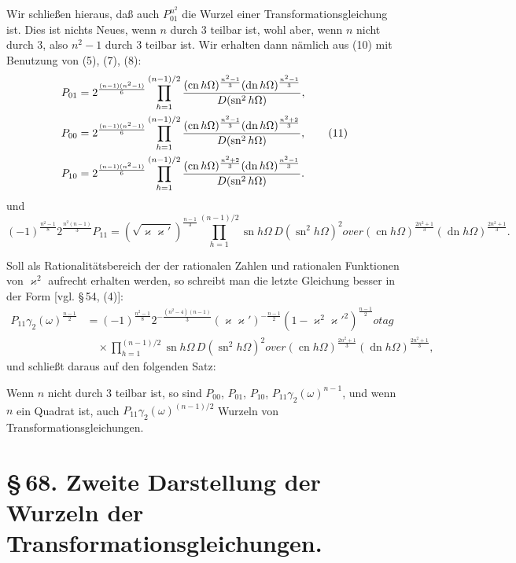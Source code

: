 \documentclass[11pt]{article}
\providecommand{\sn}{\operatorname{sn}}
\providecommand{\cn}{\operatorname{cn}}
\providecommand{\dn}{\operatorname{dn}}
\begin{document}
Wir schließen hieraus, daß auch $P_{01}^{n^2}$ die Wurzel einer Transformationsgleichung
ist. Dies ist nichts Neues, wenn $n$ durch $3$ teilbar ist, wohl aber, wenn $n$ nicht durch
$3$, also $n^2-1$ durch $3$ teilbar ist. Wir erhalten dann nämlich aus (10) mit Benutzung
von (5), (7), (8):
\begin{align}
 P_{01}&=2^{\frac{(n-1)(n^2-1)}{6}}
 \prod_{h=1}^{(n-1)/2}{(\cn h\Omega)^{\frac{n^2-1}{3}}(\dn h\Omega)^{\frac{n^2-1}{3}}
 \over D(\sn^2h\Omega)},\notag\\
 P_{00}&=2^{\frac{(n-1)(n^2-1)}{6}}
 \prod_{h=1}^{(n-1)/2}{(\cn h\Omega)^{\frac{n^2-1}{3}}(\dn h\Omega)^{\frac{n^2+2}{3}}
 \over D(\sn^2h\Omega)},
\tag{11}\\
 P_{10}&=2^{\frac{(n-1)(n^2-1)}{6}}
 \prod_{h=1}^{(n-1)/2}{(\cn h\Omega)^{\frac{n^2+2}{3}}(\dn h\Omega)^{\frac{n^2-1}{3}}
 \over D(\sn^2h\Omega)}.\notag
\end{align}
und
\begin{equation}
 (-1)^{\frac{n^2-1}{8}}2^{\frac{n^2(n-1)}{3}}P_{11}
 =(\sqrt{\varkappa\varkappa'})^{\frac{n-1}{3}}
 \prod_{h=1}^{(n-1)/2}{\sn h\Omega\,D(\sn^2h\Omega)^2
over (\cn h\Omega)^{\frac{2n^2+1}{3}}(\dn h\Omega)^{\frac{2n^2+1}{3}}}.
\tag{12}
\end{equation}

Soll als Rationalitätsbereich der der rationalen Zahlen und rationalen Funktionen von
$\varkappa^2$ aufrecht erhalten werden, so schreibt man die letzte Gleichung besser in der
Form [vgl. \S\,54, (4)]:
\begin{align}
 P_{11}\gamma_2(\omega)^{\frac{n-1}{2}}
 &=(-1)^{\frac{n^2-1}{8}}
 2^{-\frac{(n^2-4)(n-1)}{3}}
 (\varkappa\varkappa')^{-\frac{n-1}{2}}
 (1-\varkappa^2\varkappa'^2)^{\frac{n-1}{2}}
otag\\
&\quad\times
 \prod_{h=1}^{(n-1)/2}{\sn h\Omega\,D(\sn^2h\Omega)^2
over (\cn h\Omega)^{\frac{2n^2+1}{3}}(\dn h\Omega)^{\frac{2n^2+1}{3}}},
\tag{13}
\end{align}
und schließt daraus auf den folgenden Satz:

Wenn $n$ nicht durch $3$ teilbar ist, so sind $P_{00}$, $P_{01}$, $P_{10}$,
$P_{11}\gamma_2(\omega)^{n-1}$, und wenn $n$ ein Quadrat ist, auch
$P_{11}\gamma_2(\omega)^{(n-1)/2}$ Wurzeln von Transformationsgleichungen.

\section*{\S\,68. Zweite Darstellung der Wurzeln der Transformationsgleichungen.}
\end{document}
